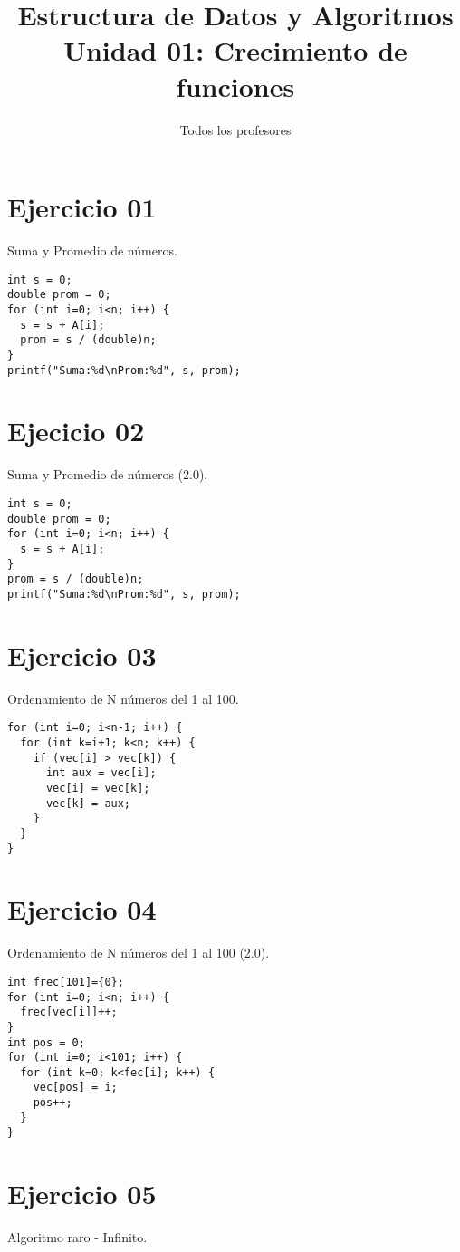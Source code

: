 \documentclass{article}
\title{Estructura de Datos y Algoritmos \\
  \large Unidad 01: Crecimiento de funciones}
\author{Todos los profesores}
\date{}
\begin{document}
\maketitle


\section{Ejercicio 01}
Suma y Promedio de números.

\begin{lstlisting}
int s = 0;
double prom = 0;
for (int i=0; i<n; i++) {
  s = s + A[i];
  prom = s / (double)n;
}
printf("Suma:%d\nProm:%d", s, prom);
\end{lstlisting}

\section{Ejecicio 02}
Suma y Promedio de números (2.0).

\begin{lstlisting}
int s = 0;
double prom = 0;
for (int i=0; i<n; i++) {
  s = s + A[i];
}
prom = s / (double)n;
printf("Suma:%d\nProm:%d", s, prom);
\end{lstlisting}

\section{Ejercicio 03}
Ordenamiento de N números del 1 al 100.

\begin{lstlisting}
for (int i=0; i<n-1; i++) {
  for (int k=i+1; k<n; k++) {
    if (vec[i] > vec[k]) {
      int aux = vec[i];
      vec[i] = vec[k];
      vec[k] = aux;
    }
  }
}
\end{lstlisting}

\section{Ejercicio 04}
Ordenamiento de N números del 1 al 100 (2.0).

\begin{lstlisting}
int frec[101]={0};
for (int i=0; i<n; i++) {
  frec[vec[i]]++;
}
int pos = 0;
for (int i=0; i<101; i++) {
  for (int k=0; k<fec[i]; k++) {
    vec[pos] = i;
    pos++;
  }
}
\end{lstlisting}

\section{Ejercicio 05}
Algoritmo raro - Infinito.
\end{document}
